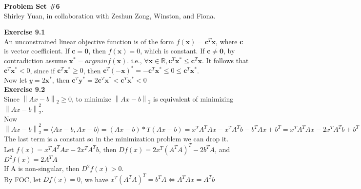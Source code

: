 \documentclass[letterpaper,12pt]{article}
\theoremstyle{definition}
\renewcommand{\vec}[1]{\mathbf{#1}}
\newcommand{\norm}[1]{\left\lVert#1\right\rVert}
\begin{document}
\begin{flushleft}
  \textbf{\large{Problem Set \#6}} \\
Shirley Yuan, in collaboration with Zeshun Zong, Winston, and Fiona.
\end{flushleft}


\noindent\textbf{Exercise 9.1}\\
An unconstrained linear objective function is of the form $f(\vec{x})=\vec{c}^T\vec{x}$, where $\vec{c}$ is vector coefficient. If $\vec{c}=\vec{0}$, then $f(\vec{x})=0$, which is constant. If $\vec{c}\neq \vec{0}$, by contradiction assume $\vec{x}^*=argmin f(\vec{x})$. i.e., $\forall \vec{x} \in \mathbb{R}, \vec{c}^T\vec{x}^*\leq \vec{c}^T\vec{x}$. It follows that $\vec{c}^T\vec{x}^*<0$, since if $\vec{c}^T\vec{x}^*\geq 0$, then $\vec{c}^T(\vec{-x})^*=-\vec{c}^T\vec{x}^*\leq0\leq \vec{c}^T\vec{x}^*$.\\
Now let $y=2\vec{x}^*$, then $\vec{c}^T\vec{y}^*=2\vec{c}^T\vec{x}^*<\vec{c}^T\vec{x}^*<0$\\

\noindent\textbf{Exercise 9.2}\\
Since $\norm{Ax-b}_2\geq 0$, to minimize $\norm{Ax-b}_2$ is equivalent of minimizing $\norm{Ax-b}_2^2$.\\
Now  $\norm{Ax-b}_2^2=\langle Ax-b, Ax-b\rangle=(Ax-b)*T(Ax-b)=x^TA^TAx-x^TA^Tb-b^TAx+b^T=x^TA^TAx-2x^TA^Tb+b^T$ \\
The last term is a constant so in the minimization problem we can drop it. \\
Let $f(x)= x^TA^TAx-2x^TA^Tb$, then $Df(x)= 2x^T(A^TA)^T-2b^TA$, and $D^2f(x)=2A^TA$\\
If A is non-singular, then $D^2f(x)>0$. \\
By FOC, let $Df(x)=0$, we have $x^T(A^TA)^T=b^TA\Leftrightarrow A^TAx=A^Tb$\\
\end{document}
